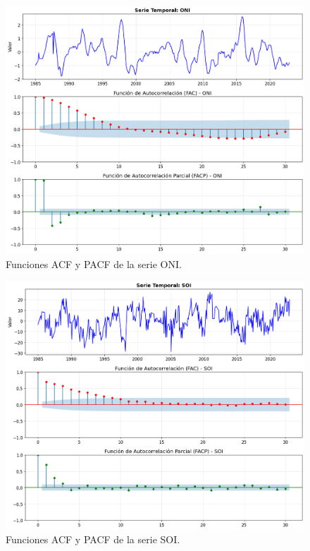\begin{figure}[H]
    \centering
    \includegraphics[scale=.42]{Figures/facp_ONI.png}
    \caption{Funciones ACF y PACF de la serie ONI.}
    \label{fig:facp_oni}
\end{figure}

\begin{figure}[H]
    \centering
    \includegraphics[scale=.42]{Figures/facp_SOI.png}
    \caption{Funciones ACF y PACF de la serie SOI.}
    \label{fig:facp_soi}
\end{figure}

